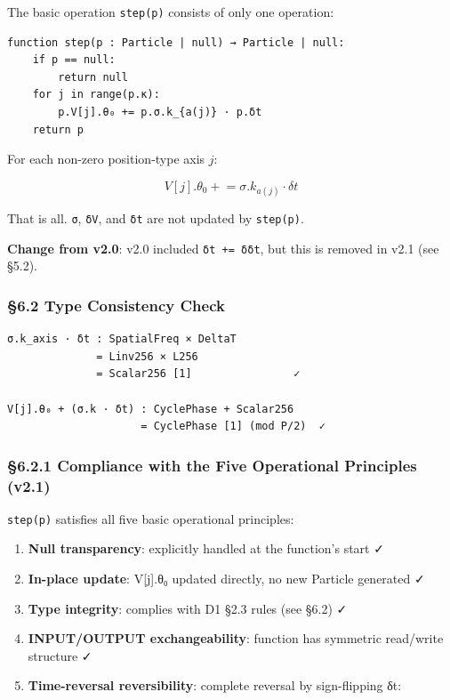 \documentclass[a4paper,11pt]{article}
\providecommand{\tightlist}{\setlength{\itemsep}{0pt}\setlength{\parskip}{0pt}}
\begin{document}
The basic operation \texttt{step(p)} consists of only one operation:

\begin{verbatim}
function step(p : Particle | null) → Particle | null:
    if p == null:
        return null
    for j in range(p.κ):
        p.V[j].θ₀ += p.σ.k_{a(j)} · p.δt
    return p
\end{verbatim}

For each non-zero position-type axis \(j\):

\[V[j].\theta_0 \mathrel{+}= \sigma.k_{a(j)} \cdot \delta t\]

That is all. \texttt{σ}, \texttt{δV}, and \texttt{δt} are not updated by
\texttt{step(p)}.

\textbf{Change from v2.0}: v2.0 included \texttt{δt\ +=\ δδt}, but this
is removed in v2.1 (see §5.2).

\subsubsection{§6.2 Type Consistency
Check}\label{type-consistency-check}

\begin{verbatim}
σ.k_axis · δt : SpatialFreq × DeltaT 
              = Linv256 × L256 
              = Scalar256 [1]                ✓

V[j].θ₀ + (σ.k · δt) : CyclePhase + Scalar256 
                     = CyclePhase [1] (mod P/2)  ✓
\end{verbatim}

\subsubsection{§6.2.1 Compliance with the Five Operational Principles
(v2.1)}\label{compliance-with-the-five-operational-principles-v2.1}

\texttt{step(p)} satisfies all five basic operational principles:

\begin{enumerate}
\def\labelenumi{\arabic{enumi}.}
\tightlist
\item
  \textbf{Null transparency}: explicitly handled at the function's start
  ✓
\item
  \textbf{In-place update}: V{[}j{]}.θ₀ updated directly, no new
  Particle generated ✓
\item
  \textbf{Type integrity}: complies with D1 §2.3 rules (see §6.2) ✓
\item
  \textbf{INPUT/OUTPUT exchangeability}: function has symmetric
  read/write structure ✓
\item
  \textbf{Time-reversal reversibility}: complete reversal by
  sign-flipping δt:
\end{enumerate}
\end{document}
